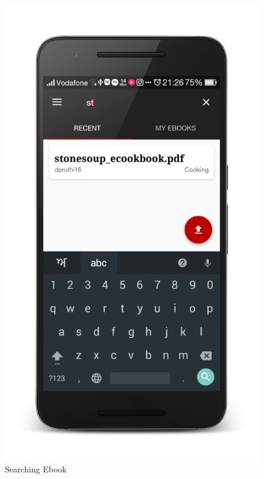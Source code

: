 \begin{figure}[ht]
\centering
\includegraphics[scale=0.13]{images/d10.png}
\caption{Searching Ebook}
\end{figure}

\newpage

